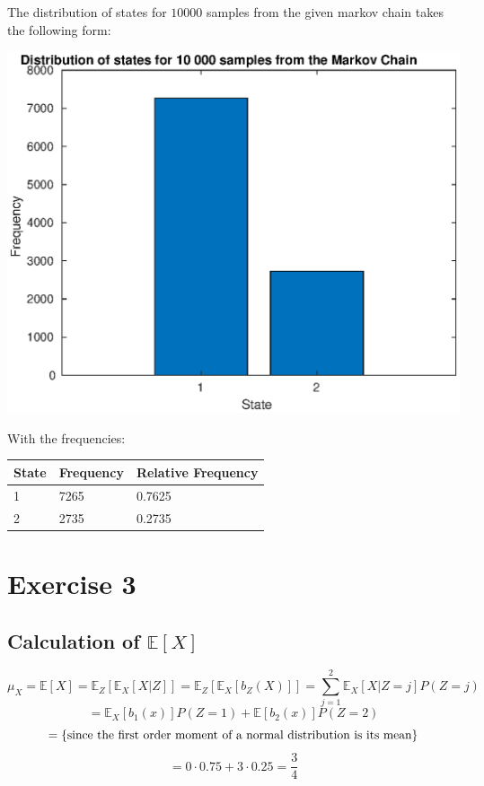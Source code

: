 \documentclass[]{article}
\let\origfigure\figure
\let\endorigfigure\endfigure
\renewenvironment{figure}[1][2] {
    \expandafter\origfigure\expandafter[H]
} {
    \endorigfigure
}
\begin{document}
The distribution of states for \(10 000\) samples from the given markov
chain takes the following form:

\begin{figure}
\centering
\includegraphics{Result_Pics/stateDistr.eps}
\caption{Distribution of states over 10 000 samples}
\end{figure}

With the frequencies:

\begin{longtable}[]{@{}lll@{}}
\toprule
State & Frequency & Relative Frequency\tabularnewline
\midrule
\endhead
1 & 7265 & 0.7625\tabularnewline
2 & 2735 & 0.2735\tabularnewline
\bottomrule
\end{longtable}

\newpage

\hypertarget{exercise-3}{%
\section{Exercise 3}\label{exercise-3}}

\hypertarget{calculation-of-mathbbex}{%
\subsection{\texorpdfstring{Calculation of
\(\mathbb{E}[X]\)}{Calculation of \textbackslash{}mathbb\{E\}{[}X{]}}}\label{calculation-of-mathbbex}}

\[\mu_X = \mathbb{E} [X] = \mathbb{E}_Z[ \mathbb{E}_X [X | Z]] = \mathbb{E}_Z [ \mathbb{E}_X [b_Z (X)] ] = \sum_{j = 1}^{2} \mathbb{E}_X [X | Z = j] P(Z = j)\]
\[= \mathbb{E}_X [b_1 (x)] P(Z = 1) + \mathbb{E} [b_2 (x)] P(Z = 2)\]
\[=\{\textnormal{since the first order moment of a normal distribution is its mean}\}\]
\[= 0 \cdot 0.75 + 3 \cdot 0.25 = \frac{3}{4}\]
\end{document}
